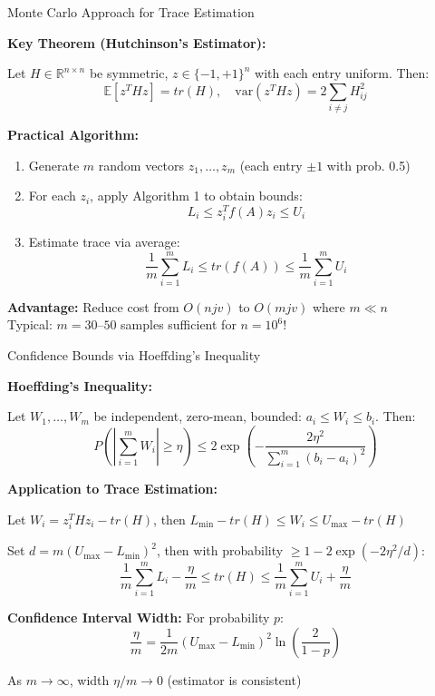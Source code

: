 \documentclass[aspectratio=169, 12pt]{beamer}
\begin{document}
\begin{frame}{Monte Carlo Approach for Trace Estimation}

\textbf{Key Theorem (Hutchinson's Estimator):}

Let \(H \in \mathbb{R}^{n \times n}\) be symmetric, \(z \in \{-1, +1\}^n\) with each entry uniform. Then:
\[
\mathbb{E}[z^T H z] = tr(H), \quad \text{var}(z^T H z) = 2 \sum_{i \neq j} H_{ij}^2
\]

\vspace{0.3cm}

\textbf{Practical Algorithm:}
\begin{enumerate}
    \item Generate \(m\) random vectors \(z_1, \ldots, z_m\) (each entry \(\pm 1\) with prob. 0.5)
    \item For each \(z_i\), apply Algorithm 1 to obtain bounds:
    \[
    L_i \leq z_i^T f(A) z_i \leq U_i
    \]
    \item Estimate trace via average:
    \[
    \frac{1}{m} \sum_{i=1}^m L_i \leq tr(f(A)) \leq \frac{1}{m} \sum_{i=1}^m U_i
    \]
\end{enumerate}

\vspace{0.2cm}

\textbf{Advantage:} Reduce cost from \(O(njv)\) to \(O(mjv)\) where \(m \ll n\) \\
Typical: \(m = 30\)--\(50\) samples sufficient for \(n = 10^6\)!

\end{frame}

\begin{frame}{Confidence Bounds via Hoeffding's Inequality}

\textbf{Hoeffding's Inequality:}

Let \(W_1, \ldots, W_m\) be independent, zero-mean, bounded: \(a_i \leq W_i \leq b_i\). Then:
\[
P\left(\left|\sum_{i=1}^m W_i\right| \geq \eta\right) \leq 2 \exp\left(-\frac{2\eta^2}{\sum_{i=1}^m (b_i - a_i)^2}\right)
\]

\vspace{0.3cm}

\textbf{Application to Trace Estimation:}

Let \(W_i = z_i^T H z_i - tr(H)\), then \(L_{\min} - tr(H) \leq W_i \leq U_{\max} - tr(H)\)

\vspace{0.1cm}

Set \(d = m(U_{\max} - L_{\min})^2\), then with probability \(\geq 1 - 2\exp(-2\eta^2/d)\):
\[
\frac{1}{m}\sum_{i=1}^m L_i - \frac{\eta}{m} \leq tr(H) \leq \frac{1}{m}\sum_{i=1}^m U_i + \frac{\eta}{m}
\]

\vspace{0.1cm}

\textbf{Confidence Interval Width:} For probability \(p\):
\[
\frac{\eta}{m} = \frac{1}{2m}(U_{\max} - L_{\min})^2 \ln\left(\frac{2}{1-p}\right)
\]

As \(m \to \infty\), width \(\eta/m \to 0\) (estimator is consistent)

\end{frame}
\end{document}
